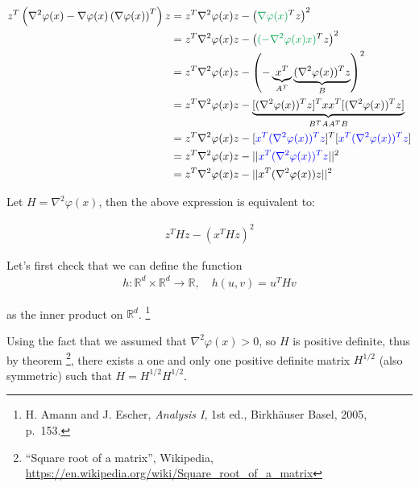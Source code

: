 \documentclass{article}
\begin{document}
\begin{align*}
    z^T \left( \nabla^2 \varphi ( x ) - \nabla \varphi ( x ) \left( \nabla \varphi (x) \right)^T \right) z 
    &= z^T \nabla^2 \varphi ( x ) z - \left( \textcolor{Green}{\nabla \varphi ( x )}^T z \right)^2 \\
    &= z^T \nabla^2 \varphi ( x ) z - \left( \textcolor{Green}{(- \nabla^2 \varphi ( x ) x)}^T z \right)^2 \\
    &= z^T \nabla^2 \varphi ( x ) z - \left( - \underbrace{x^T}_{A^T} \underbrace{(\nabla^2 \varphi ( x ))^T z }_{B} \right)^2 \\
    &= z^T \nabla^2 \varphi ( x ) z - \underbrace{[(\nabla^2 \varphi ( x ))^T z]^T x x^T [(\nabla^2 \varphi ( x ))^T z]}_{B^TAA^TB} \\
    &= z^T \nabla^2 \varphi ( x ) z - [\textcolor{blue}{x^T (\nabla^2 \varphi ( x ))^T z}]^T [\textcolor{blue}{x^T (\nabla^2 \varphi ( x ))^T z}] \\
    &= z^T \nabla^2 \varphi ( x ) z - ||\textcolor{blue}{x^T (\nabla^2 \varphi ( x ))^T z}||^2 \\
    &= z^T \nabla^2 \varphi ( x ) z - ||x^T (\nabla^2 \varphi ( x )) z||^2 
\end{align*}

Let $H = \nabla^2 \varphi ( x )$, then the above expression is equivalent to:

\begin{align*}
    z^T H z - (x^T H z)^2
\end{align*}

Let's first check that we can define the function 
\begin{align*}
    h: \mathbb{R}^d \times  \mathbb{R}^d \to \mathbb{R}, \quad h(u, v) = u^T H v
\end{align*}

as the inner product on $\mathbb{R}^d$.
\footnote{H. Amann and J. Escher, \textit{Analysis I}, 1st ed., Birkhäuser Basel, 2005, p.~153.}
\bigskip

Using the fact that we assumed that $\nabla^2 \varphi (x) > 0$, so $H$ is positive definite, 
thus by theorem
\footnote{``Square root of a matrix'', Wikipedia, \url{https://en.wikipedia.org/wiki/Square_root_of_a_matrix}}, 
there exists a one and only one positive definite matrix $H^{1/2}$ (also symmetric) such that $H = H^{1/2} H^{1/2}$.
\end{document}
